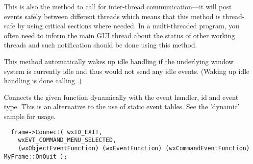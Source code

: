 This is also the method to call for inter-thread communication---it will
post events safely between different threads which means that this method is
thread-safe by using critical sections where needed.  In a multi-threaded
program, you often need to inform the main GUI thread about the status of
other working threads and such notification should be done using this method.

This method automatically wakes up idle handling if the underlying window 
system is currently idle and thus would not send any idle events. (Waking
up idle handling is done calling .)

\label{wxevthandlerconnect}



Connects the given function dynamically with the event handler, id and event type. This
is an alternative to the use of static event tables. See the 'dynamic' sample for usage.









\begin{verbatim}
  frame->Connect( wxID_EXIT,
    wxEVT_COMMAND_MENU_SELECTED,
    (wxObjectEventFunction) (wxEventFunction) (wxCommandEventFunction) MyFrame::OnQuit );
\end{verbatim}

